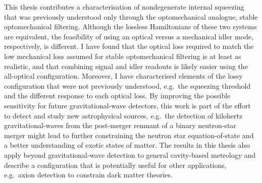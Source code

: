 This thesis contributes a characterisation of nondegenerate internal squeezing that was previously understood only through the optomechanical analogue, stable optomechanical filtering. Although the lossless Hamiltonians of these two systems are equivalent, the feasibility of using an optical versus a mechanical idler mode, respectively, is different. I have found that the optical loss required to match the low mechanical loss assumed for stable optomechanical filtering is at least as realistic, and that combining signal and idler readouts is likely easier using the all-optical configuration. Moreover, I have characterised elements of the lossy configuration that were not previously understood, e.g.\ the squeezing threshold and the different response to each optical loss.
By improving the possible sensitivity for future gravitational-wave detectors, this work is part of the effort to detect and study new astrophysical sources, e.g.\ the detection of kilohertz gravitational-waves from the post-merger remnant of a binary neutron-star merger might lead to further constraining the neutron star equation-of-state and a better understanding of exotic states of matter.
The results in this thesis also apply beyond gravitational-wave detection to general cavity-based metrology and describe a configuration that is potentially useful for other applications, e.g.\ axion detection to constrain dark matter theories.



